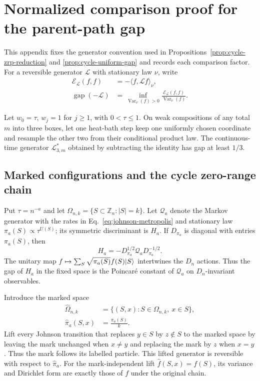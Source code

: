 \section{Normalized comparison proof for the parent-path gap}
\label{app:normalized-gap-proof}

This appendix fixes the generator convention used in
Propositions~\ref{prop:cycle-zrp-reduction} and
\ref{prop:cycle-uniform-gap} and records each comparison factor.  For a
reversible generator $\mathcal L$ with stationary law $\nu$, write
\begin{align}
 \mathcal E_{\mathcal L}(f,f)
 &=-\langle f,\mathcal Lf\rangle_\nu,\\
 \operatorname{gap}(-\mathcal L)
 &=\inf_{\operatorname{Var}_\nu(f)>0}
 \frac{\mathcal E_{\mathcal L}(f,f)}
 {\operatorname{Var}_\nu(f)}.
 \label{eq:app-dirichlet-convention}
\end{align}

\begin{lemma}
\label{lem:three-box-contraction}
Let $w_0=\tau$, $w_j=1$ for $j\geq1$, with $0<\tau\leq1$.  On weak
compositions of any total $m$ into three boxes, let one heat-bath step keep
one uniformly chosen coordinate and resample the other two from their
conditional product law.  The continuous-time generator
$\mathcal L^*_{3,m}$ obtained by subtracting the identity has gap at least
$1/3$.
\end{lemma}

\subsection{Marked configurations and the cycle zero-range chain}
\label{app:marked-zrp}

Put $\tau=n^{-a}$ and let
$\Omega_{n,k}=\{S\subset\mathbb Z_n:|S|=k\}$.  Let $\mathcal Q_a$ denote
the Markov generator with the rates in
Eq.~\eqref{eq:johnson-metropolis} and stationary law
$\pi_a(S)\propto\tau^{U(S)}$; its symmetric discriminant is $H_a$.  If
$D_{\pi_a}$ is diagonal with entries
$\pi_a(S)$, then
\begin{equation}
 H_a=-D_{\pi_a}^{1/2}\mathcal Q_aD_{\pi_a}^{-1/2}.
 \label{eq:app-discriminant-similarity}
\end{equation}
The unitary map
$f\mapsto\sum_S\sqrt{\pi_a(S)}f(S)\lvert S\rangle$ intertwines the $D_n$ actions.
Thus the gap of $H_a$ in the fixed space is the Poincar\'e constant of
$\mathcal Q_a$ on $D_n$-invariant observables.

Introduce the marked space
\begin{align}
 \widehat\Omega_{n,k}
 &=\{(S,x):S\in\Omega_{n,k},\ x\in S\},\\
 \widehat\pi_a(S,x)&=\frac{\pi_a(S)}{k}.
\end{align}
Lift every Johnson transition that replaces $y\in S$ by $z\notin S$ to the
marked space by leaving the mark unchanged when $x\ne y$ and replacing the
mark by $z$ when $x=y$.  Thus the mark follows its labelled particle.  This
lifted generator is reversible with respect to $\widehat\pi_a$.  For the
mark-independent lift $\widehat f(S,x)=f(S)$, its variance and Dirichlet
form are exactly those of $f$ under the original chain.

